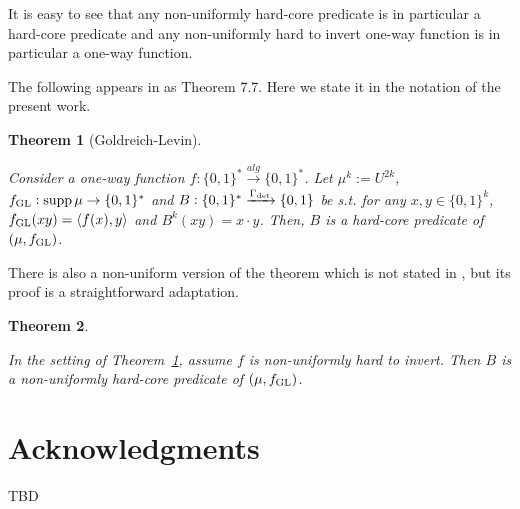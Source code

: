 \documentclass{article}
\numberwithin{equation}{section}
\theoremstyle{definition}
\theoremstyle{plain}
\newtheorem{theorem}{Theorem}[section]
\newcommand{\Words}{{\{ 0, 1 \}^*}}
\newcommand{\WordsLen}[1]{{\{ 0, 1 \}^{#1}}}
\newcommand{\Bool}{\{0,1\}}
\DeclareMathOperator{\Supp}{supp}
\newcommand{\Chev}[1]{\langle #1 \rangle}
\begin{document}
It is easy to see that any non-uniformly hard-core predicate is in particular a hard-core predicate and any non-uniformly hard to invert one-way function is in particular a one-way function.

The following appears in \cite{Goldreich_2008} as Theorem 7.7. Here we state it in the notation of the present work.

\begin{theorem}[Goldreich-Levin]
\label{thm:goldreich_levin}

Consider a one-way function ${f: \Words \xrightarrow{alg} \Words}$. Let $\mu^k:=U^{2k}$, $f_{\textnormal{GL}}: \Supp \mu \rightarrow \Words$ and ${B: \Words \xrightarrow{\Gamma_{\textnormal{det}}} \Bool}$ be s.t. for any $x,y \in \WordsLen{k}$, $f_{\textnormal{GL}}(xy)=\Chev{f(x),y}$ and ${B^k(xy)=x \cdot y}$. Then, $B$ is a hard-core predicate of $(\mu, f_{\textnormal{GL}})$.

\end{theorem}

There is also a non-uniform version of the theorem which is not stated in \cite{Goldreich_2008}, but its proof is a straightforward adaptation.

\begin{theorem}
\label{thm:goldreich_levin_circ}

In the setting of Theorem~\ref{thm:goldreich_levin}, assume $f$ is non-uniformly hard to invert. Then $B$ is a non-uniformly hard-core predicate of $(\mu, f_{\textnormal{GL}})$.
\end{theorem}

\section*{Acknowledgments}

TBD



\end{document}
